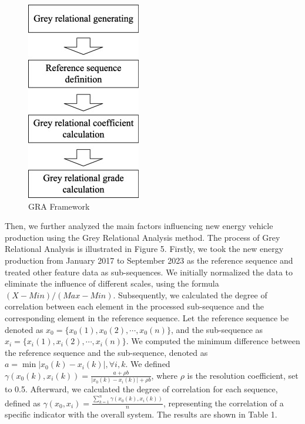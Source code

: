 \documentclass{apmcmthesis}
\begin{document}
\begin{figure}[h]
    \centering
    \includegraphics[scale=1]{figures/Figure/Grey Relation Analysis.jpg}
    \caption{GRA Framework}
\end{figure}
Then, we further analyzed the main factors influencing new energy vehicle production using the Grey Relational Analysis method. The process of Grey Relational Analysis is illustrated in Figure 5.
Firstly, we took the new energy production from January 2017 to September 2023 as the reference sequence and treated other feature data as sub-sequences. We initially normalized the data to eliminate the influence of different scales, using the formula $(X-Min)/(Max-Min)$. Subsequently, we calculated the degree of correlation between each element in the processed sub-sequence and the corresponding element in the reference sequence.
Let the reference sequence be denoted as \(x_0=\{x_0(1),x_0(2), \cdots, x_0(n)\}\), and the sub-sequence as \(x_i=\{x_i(1),x_i(2), \cdots, x_i(n)\}\). We computed the minimum difference between the reference sequence and the sub-sequence, denoted as \(a = \min|x_0(k)-x_i(k)|, \forall i,k\). We defined \(\gamma(x_0(k),x_i(k))=\frac{a+\rho b}{|x_0(k)-x_i(k)|+\rho b}\), where \(\rho\) is the resolution coefficient, set to 0.5. Afterward, we calculated the degree of correlation for each sequence, defined as \(\gamma(x_0,x_i)=\frac{\sum_{k=1}^n \gamma(x_0(k),x_i(k))}{n}\), representing the correlation of a specific indicator with the overall system. The results are shown in Table 1.
\end{document}
